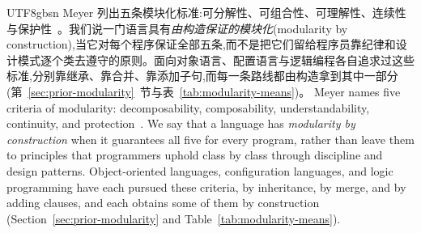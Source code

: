 \begin{CJK*}{UTF8}{gbsn}
\ifPaperChinese
Meyer 列出五条模块化标准:可分解性、可组合性、可理解性、连续性与保护性~\cite[第~40--46~页]{meyer1997-object-oriented-software-construction}。我们说一门语言具有\emph{由构造保证的模块化}(modularity by construction),当它对每个程序保证全部五条,而不是把它们留给程序员靠纪律和设计模式逐个类去遵守的原则。面向对象语言、配置语言与逻辑编程各自追求过这些标准,分别靠继承、靠合并、靠添加子句,而每一条路线都由构造拿到其中一部分(第~\ref{sec:prior-modularity}~节与表~\ref{tab:modularity-means})。
\else
Meyer names five criteria of modularity: decomposability, composability, understandability, continuity,
and protection~\cite[pp.~40--46]{meyer1997-object-oriented-software-construction}.
We say that a language has \emph{modularity by construction} when it guarantees all five for every
program, rather than leave them to principles that programmers uphold class by class through discipline and design
patterns. Object-oriented languages, configuration languages, and logic programming have each pursued
these criteria, by inheritance, by merge, and by adding clauses, and each obtains some of them by
construction (Section~\ref{sec:prior-modularity} and Table~\ref{tab:modularity-means}).
\fi


\end{CJK*}
